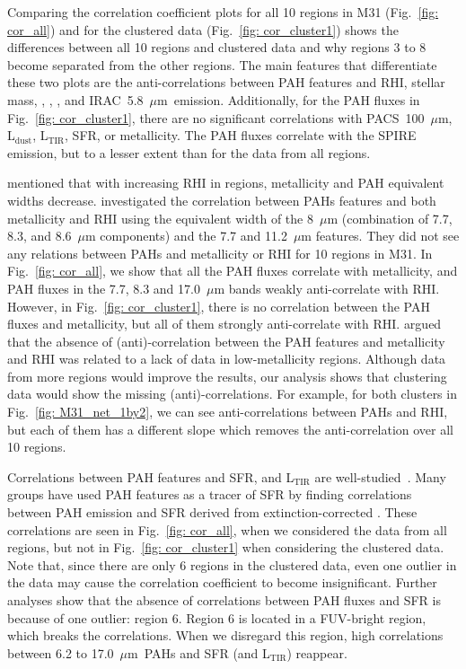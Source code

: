        
        Comparing the correlation coefficient plots for all 10 regions in M31 (Fig.~\ref{fig: cor_all}) and for the clustered data (Fig.~\ref{fig: cor_cluster1}) shows the differences between all 10 regions and clustered data and why regions 3 to 8 become separated from the other regions.
        The main features that differentiate these two plots are the anti-correlations between PAH features and RHI, stellar mass, \halphadot, \sii, \oiii, and IRAC~5.8~$\mu$m~emission.
        Additionally, for the PAH fluxes in Fig.~\ref{fig: cor_cluster1}, there are no significant correlations with PACS~100~$\mu$m, L$_\mathrm{dust}$, L$_\mathrm{TIR}$, SFR, or metallicity.
        The PAH fluxes correlate with the SPIRE emission, but to a lesser extent than for the data from all regions.
        
        \cite{Calzetti10} mentioned that with increasing RHI in regions, metallicity and PAH equivalent widths decrease. 
        \cite{Dim15} investigated the correlation between PAHs features and both metallicity and RHI using the equivalent width of the 8~$\mu$m (combination of 7.7, 8.3, and 8.6~$\mu$m components) and the 7.7 and 11.2~$\mu$m features.
        They did not see any relations between PAHs and metallicity or RHI for 10 regions in M31.
        In Fig.~\ref{fig: cor_all}, we show that all the PAH fluxes correlate with metallicity, and PAH fluxes in the 7.7, 8.3 and 17.0~$\mu$m bands weakly anti-correlate with RHI.
        However, in Fig.~\ref{fig: cor_cluster1}, there is no correlation between the PAH fluxes and metallicity, but all of them strongly anti-correlate with RHI.
        \cite{Dim15} argued that the absence of (anti)-correlation between the PAH features and metallicity and RHI was related to a lack of data in low-metallicity regions.
        Although data from more regions would improve the results, our analysis shows that clustering data would show the missing (anti)-correlations.
        For example, for both clusters in Fig.~\ref{fig: M31_net_1by2},
        we can see anti-correlations between PAHs and RHI, but each of them has a different slope which removes the anti-correlation over all 10 regions. 
        
        Correlations between PAH features and SFR, and L$_\mathrm{TIR}$ are well-studied~\citep[e.g.][]{Peeters04,Tielens08}. 
        Many groups have used PAH features as a tracer of SFR by finding correlations between 
        PAH emission and SFR derived from extinction-corrected \halpha \citep[e.g.][]{Calzetti07,Khramtsova13,Shipley16}.
        These correlations are seen in Fig.~\ref{fig: cor_all}, when we considered the data from all regions, but not in Fig.~\ref{fig: cor_cluster1} when considering the clustered data.
        Note that, since there are only 6 regions in the clustered data, even one outlier in the data may cause the correlation coefficient to become insignificant.
        Further analyses show that the absence of correlations between PAH fluxes and SFR is because of one outlier: region 6. Region 6 is located in a FUV-bright region, which breaks the correlations. 
        When we disregard this region, high correlations between 6.2 to 17.0~$\mu$m~PAHs and SFR (and L$_\mathrm{TIR}$) reappear.
        
